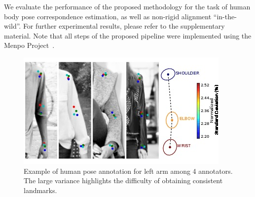 We evaluate the performance of the proposed methodology for the task of human body pose correspondence estimation, as well as non-rigid alignment ``in-the-wild''. For further experimental results, please refer to the supplementary material. Note that all steps of the proposed pipeline were implemented using the Menpo Project~\cite{menpo14}.


\begin{figure}[t!]
    \centering
    \includegraphics[width=\columnwidth]{resources/Annotation_Correction/Fig_Variance/final}
    \caption{Example of human pose annotation for left arm among 4 annotators. The large variance highlights the difficulty of obtaining consistent landmarks.}
    \label{fig:variance}
\end{figure}

